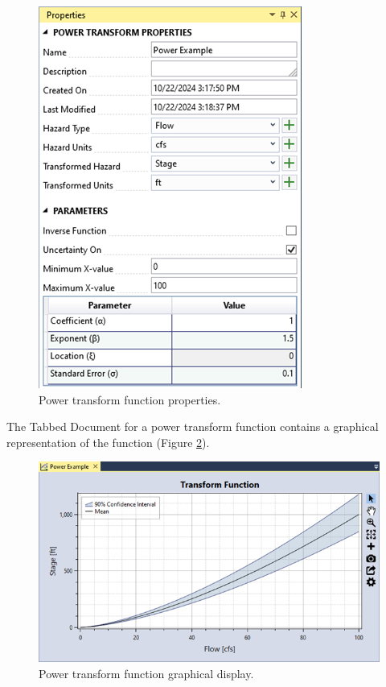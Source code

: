 \documentclass[
]{book}
\begin{document}
\begin{figure}

{\centering \includegraphics{images/figure78} 

}

\caption{Power transform function properties.}\label{fig:figure-78}
\end{figure}

The Tabbed Document for a power transform function contains a graphical representation of the function (Figure \ref{fig:figure-79}).

\begin{figure}

{\centering \includegraphics{images/figure79} 

}

\caption{Power transform function graphical display.}\label{fig:figure-79}
\end{figure}
\end{document}
